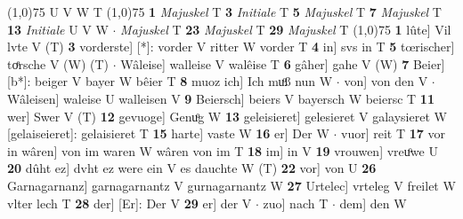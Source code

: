 \documentclass[8pt,a4paper,notitlepage]{article}
\begin{document}
\begin{table}[ht]
\begin{minipage}[t]{0.5\linewidth}
\begin{tabular}{rl}
\end{tabular}
\scriptsize
\line(1,0){75} \newline
U V W T \newline
\line(1,0){75} \newline
\textbf{1} \textit{Majuskel} T  \textbf{3} \textit{Initiale} T  \textbf{5} \textit{Majuskel} T  \textbf{7} \textit{Majuskel} T  \textbf{13} \textit{Initiale} U V W   $\cdot$ \textit{Majuskel} T  \textbf{23} \textit{Majuskel} T  \textbf{29} \textit{Majuskel} T  \newline
\line(1,0){75} \newline
\textbf{1} lûte] Vil lvte V (T) \textbf{3} vorderste] [*]: vorder V ritter W vorder T \textbf{4} in] svs in T \textbf{5} tœrischer] toͤrsche V (W) (T)  $\cdot$ Wâleise] walleise V walêise T \textbf{6} gâher] gahe V (W) \textbf{7} Beier] [b*]: beiger V bayer W bêier T \textbf{8} muoz ich] Ich muͦß nun W  $\cdot$ von] von den V  $\cdot$ Wâleisen] waleise U walleisen V \textbf{9} Beiersch] beiers V bayersch W beiersc T \textbf{11} wer] Swer V (T) \textbf{12} gevuoge] Genuͦg W \textbf{13} geleisieret] gelesieret V galaysieret W [gelaiseieret]: gelaisieret T \textbf{15} harte] vaste W \textbf{16} er] Der W  $\cdot$ vuor] reit T \textbf{17} vor in wâren] von im waren W wâren von im T \textbf{18} im] in V \textbf{19} vrouwen] vreuͦwe U \textbf{20} dûht ez] dvht ez were ein V es dauchte W (T) \textbf{22} vor] von U \textbf{26} Garnagarnanz] garnagarnantz V gurnagarnantz W \textbf{27} Urtelec] vrteleg V freilet W vlter lech T \textbf{28} der] [Er]: Der V \textbf{29} er] der V  $\cdot$ zuo] nach T  $\cdot$ dem] den W \newline
\end{minipage}
\end{table}
\end{document}
